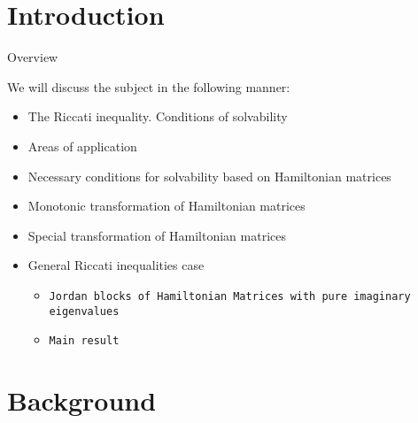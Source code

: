 






%
%
\section{Introduction}



\begin{frame}{Overview}

We will discuss the subject in the following manner:

\begin{itemize}
	\item The Riccati inequality. Conditions of solvability 
	\item Areas of application
    \item Necessary conditions for solvability based on Hamiltonian matrices
    \item Monotonic transformation of Hamiltonian matrices
	\item Special transformation of Hamiltonian matrices
    \item General Riccati inequalities case 
    \begin{itemize}
		\item \texttt{Jordan blocks of Hamiltonian Matrices with pure imaginary eigenvalues}
		\item \texttt{Main result}
		
	\end{itemize}
    
\end{itemize}

\end{frame}


%
%
\section{Background}


